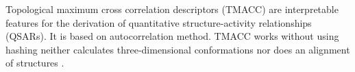 Topological maximum cross correlation descriptors (TMACC) are interpretable features for the derivation of quantitative structure-activity relationships (QSARs). It is based on autocorrelation method. TMACC works without using hashing neither calculates three-dimensional conformations nor does an alignment of structures \cite{Melville_2007}.